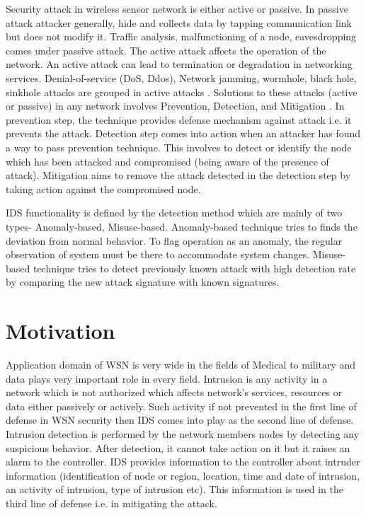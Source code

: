 Security attack in wireless sensor network is either active or passive. In passive attack attacker generally, hide and collects data by tapping communication link but does not modify it. Traffic analysis, malfunctioning of a node, eavesdropping comes under passive attack. The active attack affects the operation of the network. An active attack can lead to termination or degradation in networking services. Denial-of-service (DoS, Ddos), Network jamming, wormhole, black hole, sinkhole attacks are grouped in active attacks \cite{padmavathi2009survey}. Solutions to these attacks (active or passive) in any network involves Prevention, Detection, and Mitigation \cite{fuchsberger2005intrusion}. In prevention step, the technique provides defense mechanism against attack i.e. it prevents the attack. Detection step comes into action when an attacker has found a way to pass prevention technique. This involves to detect or identify the node which has been attacked and compromised (being aware of the presence of attack). Mitigation aims to remove the attack detected in the detection step by taking action against the compromised node.
\par
IDS functionality is defined by the detection method which are mainly of two types- Anomaly-based, Misuse-based. Anomaly-based technique tries to finds the deviation from normal behavior. To flag operation as an anomaly, the regular observation of system must be there to accommodate system changes. Misuse-based technique tries to detect previously known attack with high detection rate by comparing the new attack signature with known signatures.
\section{Motivation}
Application domain of WSN is very wide in the fields of Medical to military and data plays very important role in every field. Intrusion is any activity in a network which is not authorized which affects network's services, resources or data either passively or actively. Such activity if not prevented in the first line of defense in WSN security then IDS comes into play as the second line of defense. Intrusion detection is performed by the network members nodes by detecting any suspicious behavior. After detection, it cannot take action on it but it raises an alarm to the controller. IDS provides information to the controller about intruder information (identification of node or region, location, time and date of intrusion, an activity of intrusion, type of intrusion etc). This information is used in the third line of defense i.e. in mitigating the attack.

